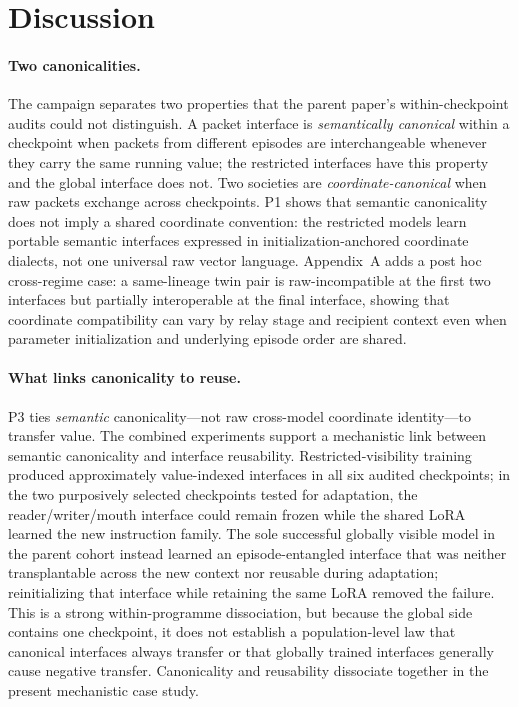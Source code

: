 \documentclass[11pt]{article}
\begin{document}
\section{Discussion}\label{sec:discussion}

\paragraph{Two canonicalities.} The campaign separates two properties that the parent paper's within-checkpoint audits could not distinguish. A packet interface is \emph{semantically canonical} within a checkpoint when packets from different episodes are interchangeable whenever they carry the same running value; the restricted interfaces have this property and the global interface does not. Two societies are \emph{coordinate-canonical} when raw packets exchange across checkpoints. P1 shows that semantic canonicality does not imply a shared coordinate convention: the restricted models learn portable semantic interfaces expressed in initialization-anchored coordinate dialects, not one universal raw vector language. Appendix~A adds a post hoc cross-regime case: a same-lineage twin pair is raw-incompatible at the first two interfaces but partially interoperable at the final interface, showing that coordinate compatibility can vary by relay stage and recipient context even when parameter initialization and underlying episode order are shared.

\paragraph{What links canonicality to reuse.} P3 ties \emph{semantic} canonicality---not raw cross-model coordinate identity---to transfer value. The combined experiments support a mechanistic link between semantic canonicality and interface reusability. Restricted-visibility training produced approximately value-indexed interfaces in all six audited checkpoints; in the two purposively selected checkpoints tested for adaptation, the reader/writer/mouth interface could remain frozen while the shared LoRA learned the new instruction family. The sole successful globally visible model in the parent cohort instead learned an episode-entangled interface that was neither transplantable across the new context nor reusable during adaptation; reinitializing that interface while retaining the same LoRA removed the failure. This is a strong within-programme dissociation, but because the global side contains one checkpoint, it does not establish a population-level law that canonical interfaces always transfer or that globally trained interfaces generally cause negative transfer. Canonicality and reusability dissociate together in the present mechanistic case study.
\end{document}
